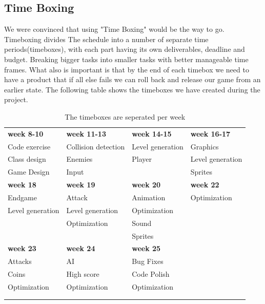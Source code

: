\subsection*{Time Boxing} %
We were convinced that using "Time Boxing" would be the way to go. Timeboxing divides The schedule into a number of separate time periods(timeboxes), with each part having its own deliverables, deadline and budget. Breaking bigger tasks into smaller tasks with better manageable time frames. What also is important is that by the end of each timebox we need to have a product that if all else fails we can roll back and release our game from an earlier state. The following table shows the timeboxes we have created during the project.
\begin{table}[h]
\begin{tabular}{llll}
  \rowcolor[HTML]{BBDAFF}
  \textbf{week 8-10}	& \textbf{week 11-13}	& \textbf{week 14-15}	& \textbf{week 16-17}	\\
  Code exercise			& Collision detection	& Level generation		& Graphics				\\
  Class design			& Enemies				& Player				& Level generation		\\
  Game Design			& Input					& 						& Sprites				\\
  \rowcolor[HTML]{BBDAFF} 
  \textbf{week 18}		& \textbf{week 19}		& \textbf{week 20}		& \textbf{week 22}		\\
  Endgame				& Attack				& Animation				& Optimization			\\
  Level generation		& Level generation		& Optimization			& 						\\
  						& Optimization			& Sound					& 						\\
  						& 						& Sprites 				& 						\\
  \textbf{week 23}		& \textbf{week 24}		& \textbf{week 25}		& 						\\
  Attacks				& AI					& Bug Fixes				& 						\\
  Coins					& High score			& Code Polish			& 						\\
  Optimization			& Optimization			& Optimization			& 						\\
  						& 						& 						& 						\\
  						& 						& 						& 						\\
\end{tabular}
\caption{The timeboxes are seperated per week}
\end{table}
\newpage

